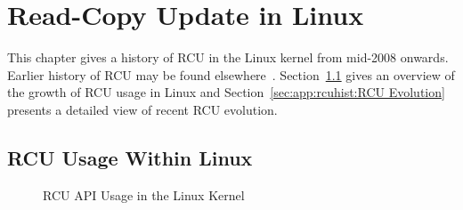 
\chapter{Read-Copy Update in Linux}
\label{app:rcuhist:Read-Copy Update in Linux}

This chapter gives a history of RCU in the Linux kernel from mid-2008
onwards.
Earlier history of RCU may be found
elsewhere~\cite{PaulEdwardMcKenneyPhD,PaulEMcKenney2008RCUOSR}.
Section~\ref{sec:app:rcuhist:RCU Usage Within Linux}
gives an overview of the growth of RCU usage in Linux and
Section~\ref{sec:app:rcuhist:RCU Evolution}
presents a detailed view of recent RCU evolution.

\section{RCU Usage Within Linux}
\label{sec:app:rcuhist:RCU Usage Within Linux}

\begin{figure}[bp]
\centering
{}
\caption{RCU API Usage in the Linux Kernel}
\label{fig:app:rcuhist:RCU API Usage in the Linux Kernel}
\end{figure}

